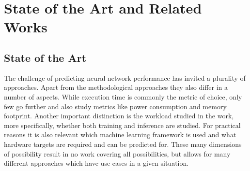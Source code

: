 \chapter{State of the Art and Related Works}\label{chap:sota}



\section{State of the Art}
The challenge of predicting neural network performance has invited a plurality of approaches.
Apart from the methodological approaches they also differ in a number of aspects.
While execution time is commonly the metric of choice, only few go further and also study metrics
like power consumption and memory footprint. Another important distinction is the workload studied
in the work, more specifically, whether both training and inference are studied.
For practical reasons it is also relevant which machine learning framework is used and what hardware
targets are required and can be predicted for. These many dimensions of possibility result in no work
covering all possibilities, but allows for many different approaches which have use cases in a given
situation.

